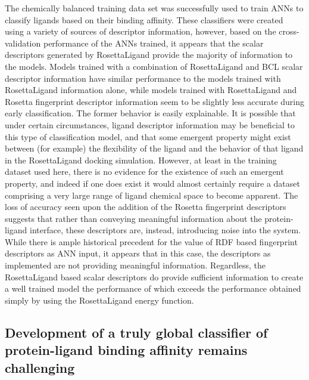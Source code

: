 The chemically balanced training data set was successfully used to train \ac{ANN}s to classify ligands based on their binding affinity.
These classifiers were created using a variety of sources of descriptor information, however, based on the cross-validation performance of the \ac{ANN}s trained, it appears that the scalar descriptors generated by RosettaLigand provide the majority of information to the models.
Models trained with a combination of RosettaLigand and \ac{BCL} scalar descriptor information have similar performance to the models trained with RosettaLigand information alone, while models trained with RosettaLigand and Rosetta fingerprint descriptor information seem to be slightly less accurate during early classification.
The former behavior is easily explainable.
It is possible that under certain circumstances, ligand descriptor information may be beneficial to this type of classification model, and that some emergent property might exist between (for example) the flexibility of the ligand and the behavior of that ligand in the RosettaLigand docking simulation.
However, at least in the training dataset used here, there is no evidence for the existence of such an emergent property, and indeed if one does exist it would almost certainly require a dataset comprising a very large range of ligand chemical space to become apparent. 
The loss of accuracy seen upon the addition of the Rosetta fingerprint descriptors suggests that rather than conveying meaningful information about the protein-ligand interface, these descriptors are, instead, introducing noise into the system.
While there is ample historical precedent \citep{Mueller:2010dx,Butkiewicz:2013ka,Hristozov:2007bz} for the value of \ac{RDF} based fingerprint descriptors as \ac{ANN} input, it appears that in this case, the descriptors as implemented are not providing meaningful information.
Regardless, the RosettaLigand based scalar descriptors do provide sufficient information to create a well trained model the performance of which exceeds the performance obtained simply by using the RosettaLigand energy function. 

\subsection{Development of a truly global classifier of protein-ligand binding affinity remains challenging}

